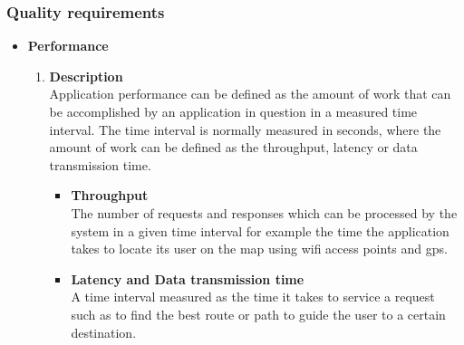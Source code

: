 \documentclass[a4paper,10pt]{article}
\begin{document}
\subsubsection{Quality requirements}
\begin{itemize}
\item \textbf {Performance}
\begin{enumerate}
\item \textbf{Description} \\
Application performance can be defined as the amount of work that can be accomplished by an application in question in a measured time interval. The time interval is normally measured in seconds, where the amount of work can be defined as the throughput, latency or data transmission time.
	\begin{itemize}
		\item \textbf{Throughput} \\
		The number of requests and responses which can be processed by the system in a given time interval for example the time the application takes to locate its user on the map using wifi access points and gps.
		\item \textbf{Latency and Data transmission time} \\
		A time interval measured as the time it takes to service a request such as to find the best route or path to guide the user to a certain destination. 
	\end{itemize}
	

\end{enumerate}
\end{itemize}
\end{document}
